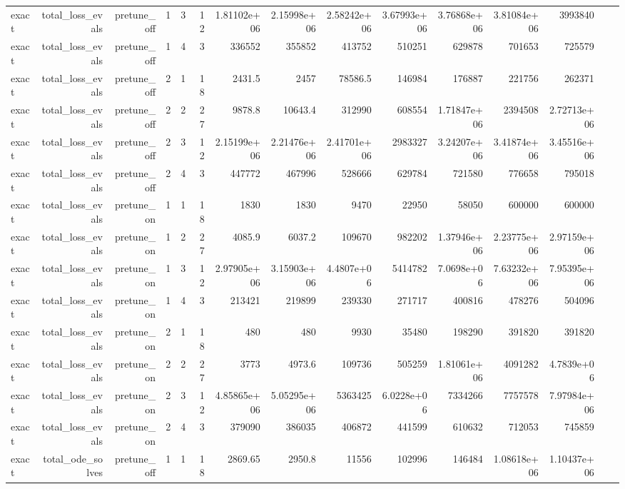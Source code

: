 \begin{table}[htbp]
\begin{tabular}{lrrrrrrrrrrrrrr}
exact & total\_loss\_evals & pretune\_off & 1 & 3 & 12 & 1.81102e+06 & 2.15998e+06 & 2.58242e+06 & 3.67993e+06 & 3.76868e+06 & 3.81084e+06 & 3993840 &  &  \\
exact & total\_loss\_evals & pretune\_off & 1 & 4 & 3 & 336552 & 355852 & 413752 & 510251 & 629878 & 701653 & 725579 &  &  \\
exact & total\_loss\_evals & pretune\_off & 2 & 1 & 18 & 2431.5 & 2457 & 78586.5 & 146984 & 176887 & 221756 & 262371 &  &  \\
exact & total\_loss\_evals & pretune\_off & 2 & 2 & 27 & 9878.8 & 10643.4 & 312990 & 608554 & 1.71847e+06 & 2394508 & 2.72713e+06 &  &  \\
exact & total\_loss\_evals & pretune\_off & 2 & 3 & 12 & 2.15199e+06 & 2.21476e+06 & 2.41701e+06 & 2983327 & 3.24207e+06 & 3.41874e+06 & 3.45516e+06 &  &  \\
exact & total\_loss\_evals & pretune\_off & 2 & 4 & 3 & 447772 & 467996 & 528666 & 629784 & 721580 & 776658 & 795018 &  &  \\
exact & total\_loss\_evals & pretune\_on & 1 & 1 & 18 & 1830 & 1830 & 9470 & 22950 & 58050 & 600000 & 600000 &  &  \\
exact & total\_loss\_evals & pretune\_on & 1 & 2 & 27 & 4085.9 & 6037.2 & 109670 & 982202 & 1.37946e+06 & 2.23775e+06 & 2.97159e+06 &  &  \\
exact & total\_loss\_evals & pretune\_on & 1 & 3 & 12 & 2.97905e+06 & 3.15903e+06 & 4.4807e+06 & 5414782 & 7.0698e+06 & 7.63232e+06 & 7.95395e+06 &  &  \\
exact & total\_loss\_evals & pretune\_on & 1 & 4 & 3 & 213421 & 219899 & 239330 & 271717 & 400816 & 478276 & 504096 &  &  \\
exact & total\_loss\_evals & pretune\_on & 2 & 1 & 18 & 480 & 480 & 9930 & 35480 & 198290 & 391820 & 391820 &  &  \\
exact & total\_loss\_evals & pretune\_on & 2 & 2 & 27 & 3773 & 4973.6 & 109736 & 505259 & 1.81061e+06 & 4091282 & 4.7839e+06 &  &  \\
exact & total\_loss\_evals & pretune\_on & 2 & 3 & 12 & 4.85865e+06 & 5.05295e+06 & 5363425 & 6.0228e+06 & 7334266 & 7757578 & 7.97984e+06 &  &  \\
exact & total\_loss\_evals & pretune\_on & 2 & 4 & 3 & 379090 & 386035 & 406872 & 441599 & 610632 & 712053 & 745859 &  &  \\
exact & total\_ode\_solves & pretune\_off & 1 & 1 & 18 & 2869.65 & 2950.8 & 11556 & 102996 & 146484 & 1.08618e+06 & 1.10437e+06 &  &  \\

\end{tabular}
\end{table}
